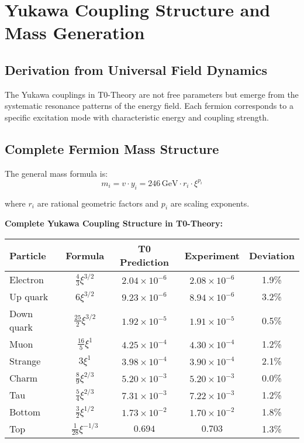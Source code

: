 \documentclass[12pt,a4paper]{article}
\theoremstyle{definition}
\begin{document}

\section{Yukawa Coupling Structure and Mass Generation}

\subsection{Derivation from Universal Field Dynamics}

The Yukawa couplings in T0-Theory are not free parameters but emerge from the systematic resonance patterns of the energy field. Each fermion corresponds to a specific excitation mode with characteristic energy and coupling strength.

\subsection{Complete Fermion Mass Structure}

The general mass formula is:
\begin{equation}
	m_i = v \cdot y_i = 246\,\text{GeV} \cdot r_i \cdot \xi^{p_i}
\end{equation}

where $r_i$ are rational geometric factors and $p_i$ are scaling exponents.

\noindent
\textbf{Complete Yukawa Coupling Structure in T0-Theory:}

\begin{center}
	\begin{tabular}{lcccc}
		\toprule
		\textbf{Particle} & \textbf{Formula} & \textbf{T0 Prediction} & \textbf{Experiment} & \textbf{Deviation} \\
		\midrule
		Electron & $\frac{4}{3}\xi^{3/2}$ & $2.04 \times 10^{-6}$ & $2.08 \times 10^{-6}$ & 1.9\% \\
		Up quark & $6\xi^{3/2}$ & $9.23 \times 10^{-6}$ & $8.94 \times 10^{-6}$ & 3.2\% \\
		Down quark & $\frac{25}{2}\xi^{3/2}$ & $1.92 \times 10^{-5}$ & $1.91 \times 10^{-5}$ & 0.5\% \\
		Muon & $\frac{16}{5}\xi^1$ & $4.25 \times 10^{-4}$ & $4.30 \times 10^{-4}$ & 1.2\% \\
		Strange & $3\xi^1$ & $3.98 \times 10^{-4}$ & $3.90 \times 10^{-4}$ & 2.1\% \\
		Charm & $\frac{8}{9}\xi^{2/3}$ & $5.20 \times 10^{-3}$ & $5.20 \times 10^{-3}$ & 0.0\% \\
		Tau & $\frac{5}{4}\xi^{2/3}$ & $7.31 \times 10^{-3}$ & $7.22 \times 10^{-3}$ & 1.2\% \\
		Bottom & $\frac{3}{2}\xi^{1/2}$ & $1.73 \times 10^{-2}$ & $1.70 \times 10^{-2}$ & 1.8\% \\
		Top & $\frac{1}{28}\xi^{-1/3}$ & $0.694$ & $0.703$ & 1.3\% \\
		\bottomrule
	\end{tabular}
\end{center}
\end{document}
